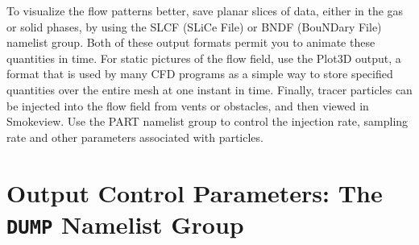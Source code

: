 \documentclass[11pt]{book}
\begin{document}
To visualize the flow patterns better, save planar
slices of data, either in the gas or solid phases, by using the
{\ct SLCF} (SLiCe File) or {\ct BNDF} (BouNDary File) namelist group.
Both of these output formats permit you to animate these quantities in
time. For static pictures of the flow field, use the Plot3D output, a format that is used by many CFD programs as a simple
way to store specified quantities over the entire mesh at one instant in time.
Finally, tracer particles can be injected into the flow field from
vents or obstacles, and then viewed in Smokeview. Use the {\ct PART}
namelist group to control the injection rate, sampling rate and other
parameters associated with particles.


\section{Output Control Parameters: The \texorpdfstring{{\tt DUMP}}{DUMP} Namelist Group}
\label{info:DUMP}
\end{document}
